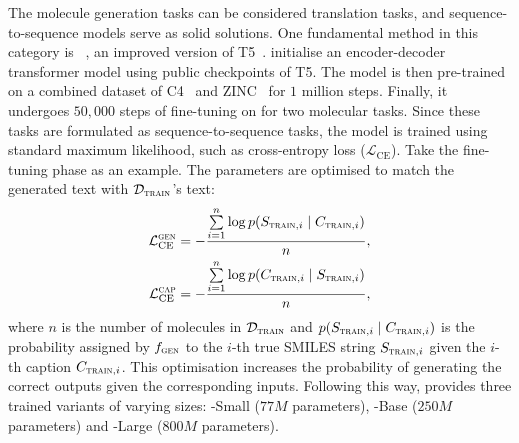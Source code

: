 The molecule generation tasks can be considered translation tasks, and sequence-to-sequence models serve as solid solutions. 
One fundamental method in this category is \oldmodel~\cite{ELRHCJ22}, an improved version of T5~\cite{RSRLNMZLL20}. 
% 
\oldmodel initialise an encoder-decoder transformer model using public checkpoints of T5. 
The model is then pre-trained on a combined dataset of C4~\cite{RSRLNMZLL20} and ZINC~\cite{SI15} for $1$ million steps.
Finally, it undergoes $50,000$ steps of fine-tuning on \olddataset for two molecular tasks. 
% 
Since these tasks are formulated as sequence-to-sequence tasks, the model is trained using standard maximum likelihood, such as cross-entropy loss  ($\mathcal{L}_{\text{CE}}$). 
Take the fine-tuning phase as an example. 
The parameters are optimised to match the generated text with $\mathcal{D}_{\textsc{train}}$'s text:
\begin{align}
\begin{split}
    \mathcal{L}_{\text{CE}}^{\textsc{gen}} &= - \frac{\sum\limits_{i = 1}^{n} \log p(S_{\textsc{train}, i} \;\vert\; C_{\textsc{train}, i})}{n}, \\
    \mathcal{L}_{\text{CE}}^{\textsc{cap}} &= - \frac{\sum\limits_{i = 1}^{n} \log p(C_{\textsc{train}, i} \;\vert\; S_{\textsc{train}, i})}{n},
\end{split}
\label{eq:molt5}
\end{align}
where $n$ is the number of molecules in $\mathcal{D}_{\textsc{train}}$ and $p(S_{\textsc{train}, i} \;\vert\; C_{\textsc{train}, i})$ is the probability assigned by $f_{\textsc{gen}}$ to the $i$-th true SMILES string $S_{\textsc{train}, i}$ given the $i$-th caption $C_{\textsc{train}, i}$. 
% 
This optimisation increases the probability of generating the correct outputs given the corresponding inputs.
% 
Following this way, \oldmodel provides three trained variants of varying sizes: \oldmodel-Small ($77M$ parameters), \oldmodel-Base ($250M$ parameters) and \oldmodel-Large ($800M$ parameters). 


